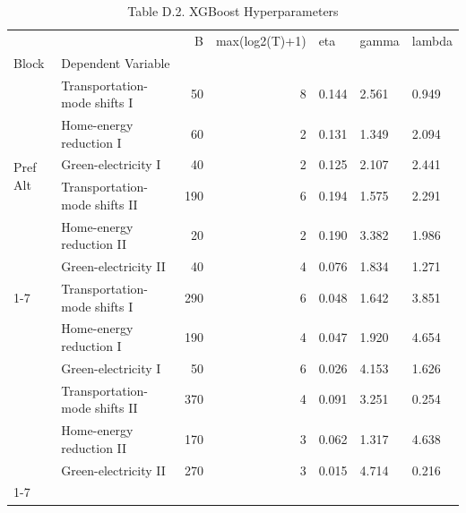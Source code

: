 \begin{table}
\caption{Table D.2. XGBoost Hyperparameters}
\begin{tabular}{llrrlll}
\toprule
 &  & B & max(log2(T)+1) & eta & gamma & lambda \\
Block & Dependent Variable &  &  &  &  &  \\
\midrule
\multirow[t]{6}{*}{Pref Alt} & Transportation-mode shifts I & 50 & 8 & 0.144 & 2.561 & 0.949 \\
 & Home-energy reduction I & 60 & 2 & 0.131 & 1.349 & 2.094 \\
 & Green-electricity I & 40 & 2 & 0.125 & 2.107 & 2.441 \\
 & Transportation-mode shifts II & 190 & 6 & 0.194 & 1.575 & 2.291 \\
 & Home-energy reduction II & 20 & 2 & 0.190 & 3.382 & 1.986 \\
 & Green-electricity II & 40 & 4 & 0.076 & 1.834 & 1.271 \\
\cline{1-7}
\multirow[t]{6}{*}{WTA} & Transportation-mode shifts I & 290 & 6 & 0.048 & 1.642 & 3.851 \\
 & Home-energy reduction I & 190 & 4 & 0.047 & 1.920 & 4.654 \\
 & Green-electricity I & 50 & 6 & 0.026 & 4.153 & 1.626 \\
 & Transportation-mode shifts II & 370 & 4 & 0.091 & 3.251 & 0.254 \\
 & Home-energy reduction II & 170 & 3 & 0.062 & 1.317 & 4.638 \\
 & Green-electricity II & 270 & 3 & 0.015 & 4.714 & 0.216 \\
\cline{1-7}
\bottomrule
\end{tabular}
\end{table}
